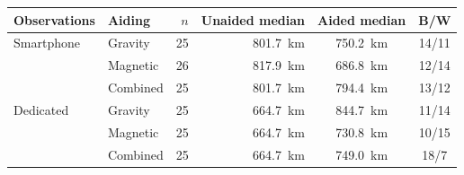 \begin{tabular}{llrrcc}
\toprule
Observations & Aiding & \(n\) & Unaided median & Aided median & B/W \\
\midrule
Smartphone & Gravity & 25 & 801.7~km & 750.2~km & 14/11 \\
 & Magnetic & 26 & 817.9~km & 686.8~km & 12/14 \\
 & Combined & 25 & 801.7~km & 794.4~km & 13/12 \\
\midrule
Dedicated & Gravity & 25 & 664.7~km & 844.7~km & 11/14 \\
 & Magnetic & 25 & 664.7~km & 730.8~km & 10/15 \\
 & Combined & 25 & 664.7~km & 749.0~km & 18/7 \\
\bottomrule
\end{tabular}
